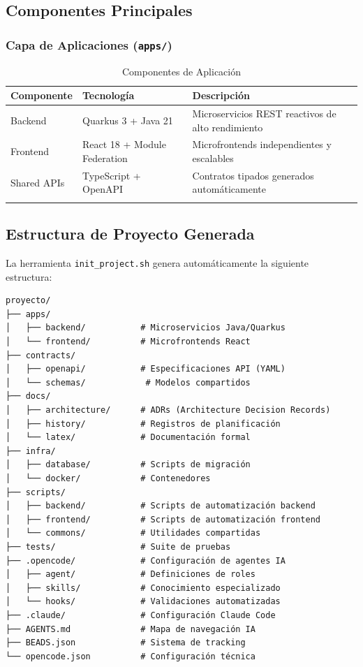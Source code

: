 \documentclass[12pt,a4paper,spanish]{article}
\begin{document}
\subsection{Componentes Principales}

\subsubsection{Capa de Aplicaciones (\texttt{apps/})}

\begin{longtable}{|p{3cm}|p{4cm}|p{6cm}|}
\toprule
\textbf{Componente} & \textbf{Tecnología} & \textbf{Descripción} \\
\midrule
Backend & Quarkus 3 + Java 21 & Microservicios REST reactivos de alto rendimiento \\
\midrule
Frontend & React 18 + Module Federation & Microfrontends independientes y escalables \\
\midrule
Shared APIs & TypeScript + OpenAPI & Contratos tipados generados automáticamente \\
\bottomrule
\caption{Componentes de Aplicación}
\end{longtable}

\subsection{Estructura de Proyecto Generada}

La herramienta \texttt{init\_project.sh} genera automáticamente la siguiente estructura:

\begin{verbatim}
proyecto/
├── apps/
│   ├── backend/           # Microservicios Java/Quarkus
│   └── frontend/          # Microfrontends React
├── contracts/
│   ├── openapi/           # Especificaciones API (YAML)
│   └── schemas/            # Modelos compartidos
├── docs/
│   ├── architecture/      # ADRs (Architecture Decision Records)
│   ├── history/           # Registros de planificación
│   └── latex/             # Documentación formal
├── infra/
│   ├── database/          # Scripts de migración
│   └── docker/            # Contenedores
├── scripts/
│   ├── backend/           # Scripts de automatización backend
│   ├── frontend/          # Scripts de automatización frontend
│   └── commons/           # Utilidades compartidas
├── tests/                 # Suite de pruebas
├── .opencode/             # Configuración de agentes IA
│   ├── agent/             # Definiciones de roles
│   ├── skills/            # Conocimiento especializado
│   └── hooks/             # Validaciones automatizadas
├── .claude/               # Configuración Claude Code
├── AGENTS.md              # Mapa de navegación IA
├── BEADS.json             # Sistema de tracking
└── opencode.json          # Configuración técnica
\end{verbatim}
\end{document}
